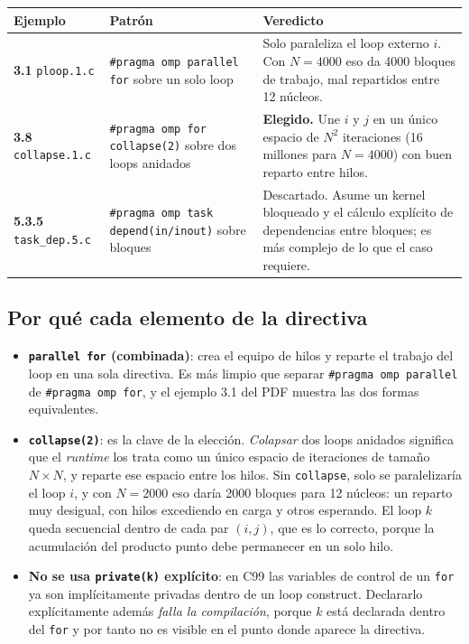 \begin{center}
\begin{tabular}{|l|p{6cm}|p{6cm}|}
\hline
\textbf{Ejemplo} & \textbf{Patrón} & \textbf{Veredicto} \\
\hline
\textbf{3.1} \texttt{ploop.1.c} &
\texttt{\#pragma omp parallel for} sobre un solo loop &
Solo paraleliza el loop externo $i$. Con $N=4000$ eso da 4000 bloques de trabajo, mal repartidos entre 12 núcleos. \\
\hline
\textbf{3.8} \texttt{collapse.1.c} &
\texttt{\#pragma omp for collapse(2)} sobre dos loops anidados &
\textbf{Elegido.} Une $i$ y $j$ en un único espacio de $N^2$ iteraciones (16 millones para $N=4000$) con buen reparto entre hilos. \\
\hline
\textbf{5.3.5} \texttt{task\_dep.5.c} &
\texttt{\#pragma omp task depend(in/inout)} sobre bloques &
Descartado. Asume un kernel bloqueado y el cálculo explícito de dependencias entre bloques; es más complejo de lo que el caso requiere. \\
\hline
\end{tabular}
\end{center}

\subsection{Por qué cada elemento de la directiva}

\begin{itemize}
    \item \textbf{\texttt{parallel for} (combinada)}: crea el equipo de hilos y reparte el trabajo del loop en una sola directiva. Es más limpio que separar \texttt{\#pragma omp parallel} de \texttt{\#pragma omp for}, y el ejemplo 3.1 del PDF muestra las dos formas equivalentes.
    \item \textbf{\texttt{collapse(2)}}: es la clave de la elección. \emph{Colapsar} dos loops anidados significa que el \textit{runtime} los trata como un único espacio de iteraciones de tamaño $N \times N$, y reparte ese espacio entre los hilos. Sin \texttt{collapse}, solo se paralelizaría el loop $i$, y con $N=2000$ eso daría 2000 bloques para 12 núcleos: un reparto muy desigual, con hilos excediendo en carga y otros esperando. El loop $k$ queda secuencial dentro de cada par $(i,j)$, que es lo correcto, porque la acumulación del producto punto debe permanecer en un solo hilo.
    \item \textbf{No se usa \texttt{private(k)} explícito}: en C99 las variables de control de un \texttt{for} ya son implícitamente privadas dentro de un loop construct. Declararlo explícitamente además \emph{falla la compilación}, porque $k$ está declarada dentro del \texttt{for} y por tanto no es visible en el punto donde aparece la directiva.
\end{itemize}

